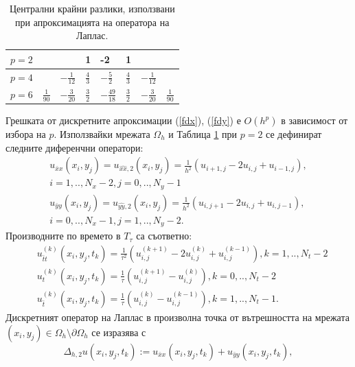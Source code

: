 \documentclass[a4paper]{article}
\newcommand{\rf}[1]{(\ref{#1})}
\theoremstyle{remark}
\begin{document}
\begin{large}
\begin{table}[ht]
\centering
\small
		\begin{tabular}{||c|l|l|l|l|l|l|l||}
			\hline
			\hline
            $p=2$          &          &                                 &     1      &   -2   &    1    &    &        \\
   			\hline 
			\hline 
           $p=4$          &                            &   $-\frac{1}{12}$     &     $\frac{4}{3}$      &   $-\frac{5}{2} $     &    $\frac{4}{3}$    &  $-\frac{1}{12}$   &        \\
	   \hline
			\hline 
            $p=6$        &   $\frac{1}{90}$       &     $-\frac{3}{20}$     &    $\frac{3}{2}$      &    $-\frac{49}{18}$   &    $\frac{3}{2}$    & $-\frac{3}{20}$    &    $\frac{1}{90}$       \\
	   \hline
			\hline 
		\end{tabular}
	\caption{Централни крайни разлики, използвани при апроксимацията на оператора на Лаплас.}
	\label{table:A00}
\end{table}
Грешката от дискретните апроксимации \rf{fdx}, \rf{fdy} е $O(h^p)$ в зависимост от избора на $p$. Използвайки мрежата $\Omega_h$ и Таблица \ref{table:A00} при $p=2$ се дефинират следните диференчни оператори:
\begin{align}
u_{\bar{x}x}(x_i,y_j) = u_{\widehat{xx},2}(x_i,y_j) = \frac{1}{h^2}(u_{i+1,j} - 2u_{i,j} + u_{i-1,j}), \nonumber\\ 
i = 1,.., N_x-2, j = 0,.., N_y-1 \nonumber\\
u_{\bar{y}y}(x_i,y_j) = u_{\widehat{yy},2}(x_i,y_j) = \frac{1}{h^2}(u_{i,j+1} - 2u_{i,j} + u_{i,j-1}),  \nonumber\\
i = 0,.., N_x-1, j = 1,.., N_y-2. \nonumber
\end{align}
Производните по времето в $T_{\tau}$ са съответно:
\begin{align}
& u^{(k)}_{\bar{t}t}(x_i,y_j,t_k) = \frac{1}{\tau^2}(u_{i,j}^{(k+1)} - 2u_{i,j}^{(k)} + u_{i,j}^{(k-1)}), k = 1,..,N_t-2 \nonumber\\
& u^{(k)}_{t}(x_i,y_j,t_k) =  \frac{1}{\tau}(u_{i,j}^{(k+1)} - u_{i,j}^{(k)}), k = 0,.., N_{t}-2 \nonumber\\
& u^{(k)}_{\bar{t}}(x_i,y_j,t_k) =  \frac{1}{\tau}(u_{i,j}^{(k)} - u_{i,j}^{(k-1)}), k = 1,.., N_{t}-1 \nonumber.
\end{align}
Дискретният оператор на Лаплас в произволна точка от вътрешността на мрежата $(x_i, y_j) \in \Omega_h \setminus \partial\Omega_h$ се изразява с 
$$\Delta_{h,2}u(x_i, y_j, t_k) :=  u_{\bar{x}x}(x_i, y_j, t_k) + u_{\bar{y}y}(x_i, y_j, t_k),$$

\end{large}
\end{document}

